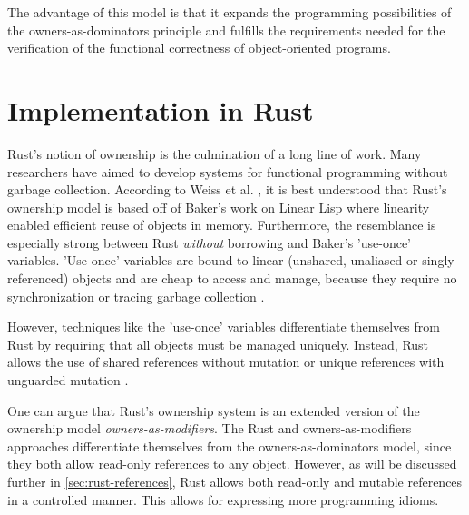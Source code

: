 \documentclass[sigplan,11pt,nonacm]{acmart}
\begin{document}
The advantage of this model is that it expands the programming possibilities of the owners-as-dominators principle and fulfills the requirements needed for the verification of the functional correctness of object-oriented programs. \cite{ownership-types-survey}






\section{Implementation in Rust}
\label{sec:implementation-in-rust}

Rust's notion of ownership is the culmination of a long line of work.
Many researchers have aimed to develop systems for functional programming without garbage collection.
According to Weiss et al. \cite{oxide}, it is best understood that Rust's ownership model is based off of Baker's work on Linear Lisp \cite{linear-lisp} where linearity enabled efficient reuse of objects in memory.
Furthermore, the resemblance is especially strong between Rust \emph{without} borrowing and Baker's 'use-once' variables.
'Use-once' variables are bound to linear (unshared, unaliased or singly-referenced) objects and are cheap to access and manage, because they require no synchronization or tracing garbage collection \cite{use-once}.

However, techniques like the 'use-once' variables differentiate themselves from Rust by requiring that all objects must be managed uniquely.
Instead, Rust allows the use of shared references without mutation or unique references with unguarded mutation \cite{oxide}.

One can argue that Rust's ownership system is an extended version of the ownership model \emph{owners-as-modifiers}.
The Rust and owners-as-modifiers approaches differentiate themselves from the owners-as-dominators model, since they both allow read-only references to any object.
However, as will be discussed further in \ref{sec:rust-references}, Rust allows both read-only and mutable references in a controlled manner.
This allows for expressing more programming idioms.
\end{document}
